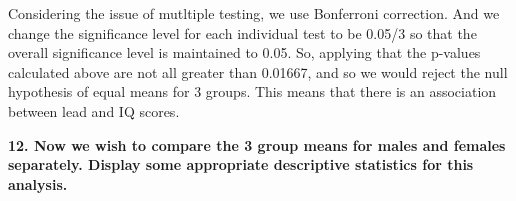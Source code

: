 \documentclass[
]{article}
\newenvironment{Shaded}{\begin{snugshade}}{\end{snugshade}}
\newcommand{\DecValTok}[1]{\textcolor[rgb]{0.00,0.00,0.81}{#1}}
\newcommand{\FunctionTok}[1]{\textcolor[rgb]{0.00,0.00,0.00}{#1}}
\newcommand{\NormalTok}[1]{#1}
\newcommand{\OtherTok}[1]{\textcolor[rgb]{0.56,0.35,0.01}{#1}}
\newcommand{\SpecialCharTok}[1]{\textcolor[rgb]{0.00,0.00,0.00}{#1}}
\begin{document}
Considering the issue of mutltiple testing, we use Bonferroni
correction. And we change the significance level for each individual
test to be 0.05/3 so that the overall significance level is maintained
to 0.05. So, applying that the p-values calculated above are not all
greater than 0.01667, and so we would reject the null hypothesis of
equal means for 3 groups. This means that there is an association
between lead and IQ scores.

\textbf{12. Now we wish to compare the 3 group means for males and
females separately. Display some appropriate descriptive statistics for
this analysis.}

\begin{Shaded}
\end{Shaded}
\end{document}
